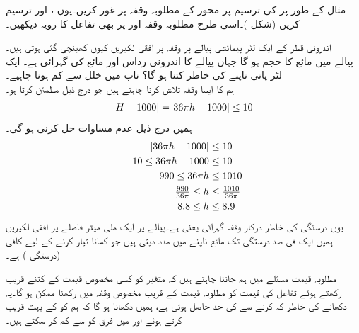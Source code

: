 مثال کے طور پر  کی  ترسیم پر محور  کے مطلوبہ وقفہ  پر غور کریں۔یوں ،  اور  ترسیم کریں (شکل )۔اسی طرح مطلوبہ وقفہ  اور  پر بھی تفاعل کا رویہ دیکھیں۔


 اندرونی قطر کے ایک لٹر  پیمائشی پیالے پر  وقفہ پر افقی لکیریں کیوں کھینچی گئی ہوتی ہیں۔\\
پیالے میں مائع کا حجم  ہو گا جہاں پیالے کا اندرونی رداس  اور مائع کی گہرائی  ہے۔ ایک لٹر  پانی ناپنے کی خاطر  کتنا ہو گا؟ ناپ میں خلل  سے کم ہونا چاہیے۔\\
ہم  کا ایسا وقفہ تلاش کرنا چاہتے ہیں جو  درج ذیل مطمئن کرتا ہو۔
\begin{align*}
\abs{H-1000}=\abs{36\pi h-1000}\le 10
\end{align*}
ہمیں درج ذیل عدم مساوات حل کرنی ہو گی۔
\begin{align*}
\abs{36\pi h-1000}&\le 10\\
-10\le 36\pi h-1000&\le 10\\
990\le 36\pi h&\le 1010\\
\tfrac{990}{36\pi}\le h &\le \tfrac{1010}{36\pi}\\
8.8\le h &\le 8.9
\end{align*}
یوں  درستگی کی خاطر درکار وقفہ گہرائی  یعنی  ہے۔پیالے پر ایک ملی میٹر فاصلے پر افقی لکیریں ہمیں ایک فی صد درستگی تک مائع ناپنے میں مدد دیتی ہیں جو کھانا تیار کرنے کے لیے کافی (درستگی ) ہے۔

مطلوبہ قیمت مسئلے میں ہم جاننا چاہتے ہیں کہ متغیر  کو کسی مخصوص قیمت  کے کتنے قریب رکھتے ہوئے تفاعل  کی قیمت کو مطلوبہ قیمت  کے قریب مخصوص وقفہ میں رکھنا ممکن ہو گا۔یہ دکھانے کی خاطر کہ  کرنے سے  کی حد  حاصل ہوتی ہے، ہمیں دکھانا ہو گا کہ ہم 
 کو  کے بہت قریب کرتے ہوئے   اور  میں فرق کو  سے کم کر سکتے ہیں۔

